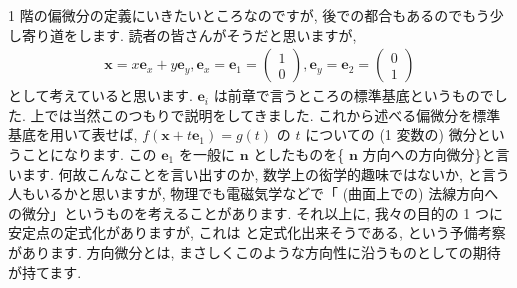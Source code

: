 \documentclass[openany, a4paper, oneside]{jsbook}
\begin{document}
1 階の偏微分の定義にいきたいところなのですが, 後での都合もあるのでもう少し寄り道をします.
読者の皆さんがそうだと思いますが,
\begin{align}
 \bm{x}=x \bm{e}_x + y \bm{e}_y,
 \bm{e}_x=\bm{e}_1=\begin{pmatrix}1\\0\end{pmatrix},
 \bm{e}_y=\bm{e}_2=\begin{pmatrix}0\\1\end{pmatrix}
\end{align}
 として考えていると思います.
$\bm{e}_i$ は前章で言うところの標準基底というものでした.
上では当然このつもりで説明をしてきました.
これから述べる偏微分を標準基底を用いて表せば,
$f (\bm{x}+t\bm{e}_1)=g (t)$ の $t$ についての (1 変数の) 微分ということになります.
この $\bm{e}_1$ を一般に $\bm{n}$ としたものを\textgt\{ $\bm{n}$ 方向への方向微分\}と言います.
何故こんなことを言い出すのか, 数学上の衒学的趣味ではないか, と言う人もいるかと思いますが,
物理でも電磁気学などで「 (曲面上での) 法線方向への微分」というものを考えることがあります.
それ以上に, 我々の目的の 1 つに安定点の定式化がありますが, これは
と定式化出来そうである, という予備考察があります.
方向微分とは, まさしくこのような方向性に沿うものとしての期待が持てます.
\end{document}
